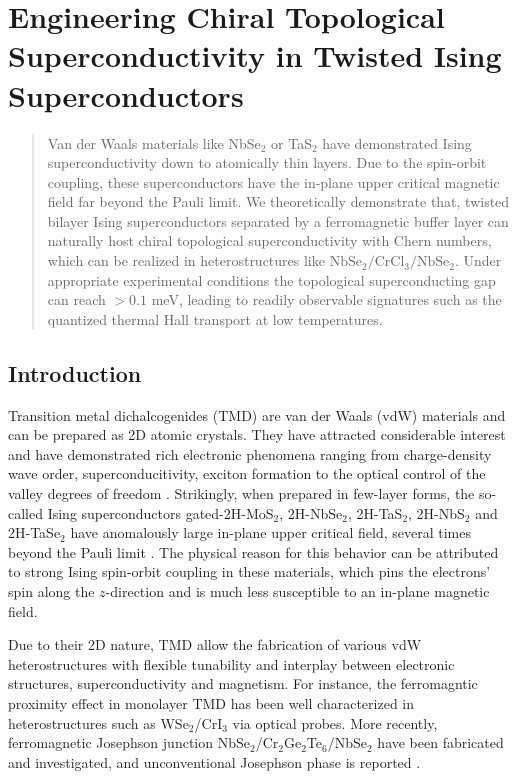 \chapter{Engineering Chiral Topological Superconductivity in Twisted Ising Superconductors}

\begin{abstract}
    Van der Waals materials like NbSe$_2$ or TaS$_2$ have demonstrated Ising superconductivity down to atomically thin layers. Due to the spin-orbit coupling, these superconductors have the in-plane upper critical magnetic field far beyond the Pauli limit. We theoretically demonstrate that, twisted bilayer Ising superconductors separated by a ferromagnetic buffer layer can naturally host chiral topological superconductivity with Chern numbers, which can be realized in heterostructures like $\mathrm{NbSe_2/CrCl_3/NbSe_2}$. Under appropriate experimental conditions the topological superconducting gap can reach $>0.1$ meV, leading to readily observable signatures such as the quantized thermal Hall transport at low temperatures.  
\end{abstract}

\section{Introduction}
Transition metal dichalcogenides (TMD) are van der Waals (vdW) materials and can be prepared as 2D atomic crystals. They have attracted considerable interest and have demonstrated rich electronic phenomena ranging from charge-density wave order, superconducitivity, exciton formation to the optical control of the valley degrees of freedom \cite{lian2018unveiling,he2020valley,jones2013optical,rivera2016valley,li2021optical}. Strikingly, when prepared in few-layer forms, the so-called Ising superconductors gated-2H-MoS$_2$, 2H-NbSe$_2$, 2H-TaS$_2$, 2H-NbS$_2$ and 2H-TaSe$_2$ have anomalously large in-plane upper critical field, several times beyond the Pauli limit \cite{costanzo2016gate,yan2019thickness,Cho2021,de2018tuning,li2017superconducting,lian2019coexistence}. The physical reason for this behavior can be attributed to strong Ising spin-orbit coupling in these materials, which pins the electrons' spin along the $z$-direction and is much less susceptible to an in-plane magnetic field.  

Due to their 2D nature, TMD allow the fabrication of various vdW heterostructures with flexible tunability and interplay between electronic structures, superconductivity and magnetism. For instance, the ferromagntic proximity effect in monolayer TMD has been well characterized in heterostructures such as WSe$_2$/CrI$_3$ \cite{cai2019atomically,aivazian2015magnetic,mcguire2017magnetic} via optical probes. More recently, ferromagnetic Josephson junction NbSe$_2$/Cr$_2$Ge$_2$Te$_6$/NbSe$_2$ have been fabricated and investigated, and unconventional Josephson phase is reported \cite{ai2021van,idzuchi2020van}.

